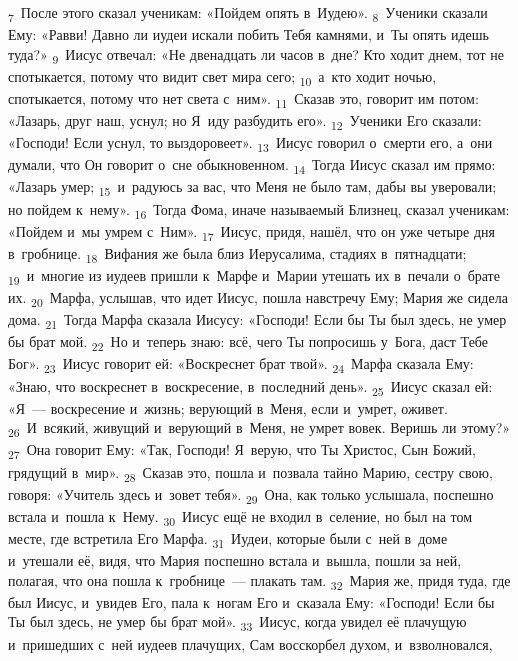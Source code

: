 \documentclass[a4paper,12pt]{article}
\begin{document}
\textsubscript{7}~После этого сказал ученикам: «Пойдем опять в~Иудею».
\textsubscript{8}~Ученики сказали Ему: «Равви! Давно ли иудеи искали побить Тебя камнями, и~Ты опять идешь туда?»
\textsubscript{9}~Иисус отвечал: «Не двенадцать ли часов в~дне? Кто ходит днем, тот не спотыкается, потому что видит свет мира сего;
\textsubscript{10}~а~кто ходит ночью, спотыкается, потому что нет света с~ним».
\textsubscript{11}~Сказав это, говорит им потом: «Лазарь, друг наш, уснул; но Я~иду разбудить его».
\textsubscript{12}~Ученики Его сказали: «Господи! Если уснул, то выздоровеет».
\textsubscript{13}~Иисус говорил о~смерти его, а~они думали, что Он говорит о~сне обыкновенном.
\textsubscript{14}~Тогда Иисус сказал им прямо: «Лазарь умер;
\textsubscript{15}~и~радуюсь за вас, что Меня не было там, дабы вы уверовали; но пойдем к~нему».
\textsubscript{16}~Тогда Фома, иначе называемый Близнец, сказал ученикам: «Пойдем и~мы умрем с~Ним».
\textsubscript{17}~Иисус, придя, нашёл, что он уже четыре дня в~гробнице.
\textsubscript{18}~Вифания же была близ Иерусалима, стадиях в~пятнадцати;
\textsubscript{19}~и~многие из иудеев пришли к~Марфе и~Марии утешать их в~печали о~брате их.
\textsubscript{20}~Марфа, услышав, что идет Иисус, пошла навстречу Ему; Мария же сидела дома.
\textsubscript{21}~Тогда Марфа сказала Иисусу: «Господи! Если бы Ты был здесь, не умер бы брат мой.
\textsubscript{22}~Но и~теперь знаю: всё, чего Ты попросишь у~Бога, даст Тебе Бог».
\textsubscript{23}~Иисус говорит ей: «Воскреснет брат твой».
\textsubscript{24}~Марфа сказала Ему: «Знаю, что воскреснет в~воскресение, в~последний день».
\textsubscript{25}~Иисус сказал ей: «Я~--- воскресение и~жизнь; верующий в~Меня, если и~умрет, оживет.
\textsubscript{26}~И~всякий, живущий и~верующий в~Меня, не умрет вовек. Веришь ли этому?»
\textsubscript{27}~Она говорит Ему: «Так, Господи! Я~верую, что Ты Христос, Сын Божий, грядущий в~мир».
\textsubscript{28}~Сказав это, пошла и~позвала тайно Марию, сестру свою, говоря: «Учитель здесь и~зовет тебя».
\textsubscript{29}~Она, как только услышала, поспешно встала и~пошла к~Нему.
\textsubscript{30}~Иисус ещё не входил в~селение, но был на том месте, где встретила Его Марфа.
\textsubscript{31}~Иудеи, которые были с~ней в~доме и~утешали её, видя, что Мария поспешно встала и~вышла, пошли за ней, полагая, что она пошла к~гробнице~--- плакать там.
\textsubscript{32}~Мария же, придя туда, где был Иисус, и~увидев Его, пала к~ногам Его и~сказала Ему: «Господи! Если бы Ты был здесь, не умер бы брат мой».
\textsubscript{33}~Иисус, когда увидел её плачущую и~пришедших с~ней иудеев плачущих, Сам восскорбел духом, и~взволновался,
\end{document}
